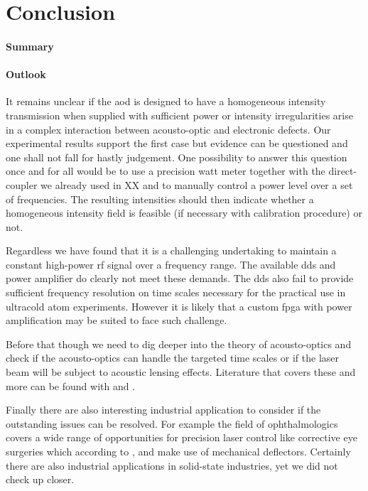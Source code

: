 \chapter{Conclusion}

\subsubsection{Summary}

\subsubsection{Outlook}

It remains unclear if the \gls{aod} is designed to have a homogeneous
intensity transmission when supplied with sufficient power or intensity
irregularities arise in a complex interaction between acousto-optic and
electronic defects. Our experimental results support the first case but
evidence can be questioned and one shall not fall for hastly judgement.
One possibility to answer this question once and for all would be to use a
precision watt meter together with the direct-coupler we already used in XX
and to manually control a power level over a set of frequencies. The
resulting intensities should then indicate whether a homogeneous intensity
field is feasible (if necessary with calibration procedure) or not.

Regardless we have found that it is a challenging undertaking to maintain a
constant high-power \gls{rf} signal over a frequency range. The available
\gls{dds} and power amplifier do clearly not meet these demands. The
\gls{dds} also fail to provide sufficient frequency resolution on time scales
necessary for the practical use in ultracold atom experiments. However it is
likely that a custom \gls{fpga} with power amplification may be suited to
face such challenge.

Before that though we need to dig deeper into the theory of acousto-optics
and check if the acousto-optics can handle the targeted time scales or if
the laser beam will be subject to acoustic lensing effects. Literature that
covers these and more can be found with \cite{Goutzoulis1994} and
\cite{Royer1999}.

Finally there are also interesting industrial application to consider if the
outstanding issues can be resolved. For example the field of ophthalmologics
covers a wide range of opportunities for precision laser control like
corrective eye surgeries which according to \cite{US20180110655},
\cite{US20180064579} and \cite{US7131968} make use of mechanical deflectors.
Certainly there are also industrial applications in solid-state industries,
yet we did not check up closer.

